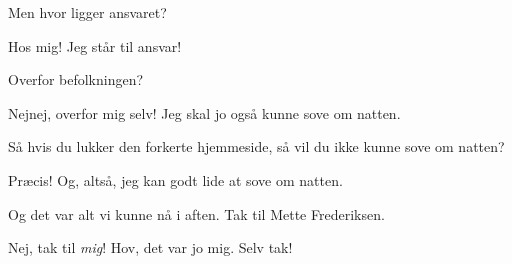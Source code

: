 \documentclass[a4paper,11pt]{article}
\begin{document}
\begin{sketch}
 Men hvor ligger ansvaret?

 Hos mig!  Jeg står til ansvar!

 Overfor befolkningen?

 Nejnej, overfor mig selv!  Jeg skal jo også kunne sove om natten.

 Så hvis du lukker den forkerte hjemmeside, så vil du ikke kunne sove
om natten?

 Præcis!  Og, altså, jeg kan godt lide at sove om natten.

 Og det var alt vi kunne nå i aften.  Tak til Mette Frederiksen.

 Nej, tak til \emph{mig}!  Hov, det var jo mig.  Selv tak!


\end{sketch}
\end{document}
